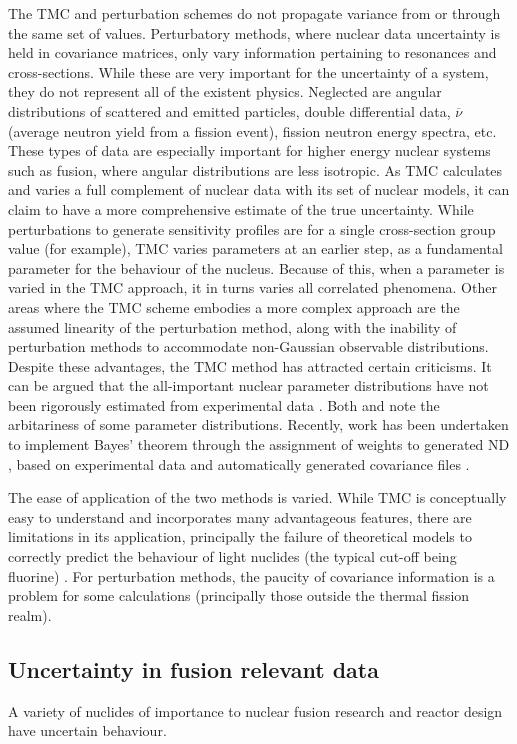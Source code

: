 The TMC and perturbation schemes do not propagate variance from or through the same set of values. Perturbatory methods, where nuclear data uncertainty is held in covariance matrices, only vary information pertaining to resonances and cross-sections. While these are very important for the uncertainty of a system, they do not represent all of the existent physics. Neglected are angular distributions of scattered and emitted particles, double differential data, $\overline{\nu}$ (average neutron yield from a fission event), fission neutron energy spectra, etc. These types of data are especially important for higher energy nuclear systems such as fusion, where angular distributions are less isotropic. As TMC calculates and varies a full complement of nuclear data with its set of nuclear models, it can claim to have a more comprehensive estimate of the true uncertainty. While perturbations to generate sensitivity profiles are for a single cross-section group value (for example), TMC varies parameters at an earlier step, as a fundamental parameter for the behaviour of the nucleus. Because of this, when a parameter is varied in the TMC approach, it in turns varies all correlated phenomena. Other areas where the TMC scheme embodies a more complex approach are the assumed linearity of the perturbation method, along with the inability of perturbation methods to accommodate non-Gaussian observable distributions. Despite these advantages, the TMC method has attracted certain criticisms. It can be argued that the all-important nuclear parameter distributions have not been rigorously estimated from experimental data \cite{Helgesson2017}. Both \citeauthor{Capote2010} and \citeauthor{Rising2012} note the arbitariness of some parameter distributions. Recently, work has been undertaken to implement Bayes' theorem through the assignment of weights to generated ND \cite{Koning2015a}, based on experimental data and automatically generated covariance files \cite{Helgesson2017}.

The ease of application of the two methods is varied. While TMC is conceptually easy to understand and incorporates many advantageous features, there are limitations in its application, principally the failure of theoretical models to correctly predict the behaviour of light nuclides (the typical cut-off being fluorine) \cite{Rochman2011}. For perturbation methods, the paucity of covariance information is a problem for some calculations (principally those outside the thermal fission realm). 

\FloatBarrier
\subsection{Uncertainty in fusion relevant data}
A variety of nuclides of importance to nuclear fusion research and reactor design have uncertain behaviour. 

